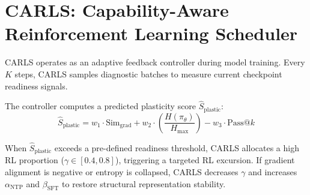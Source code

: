 \section{CARLS: Capability-Aware Reinforcement Learning Scheduler}
\label{sec:carls}

CARLS operates as an adaptive feedback controller during model training. Every $K$ steps, CARLS samples diagnostic batches to measure current checkpoint readiness signals.

The controller computes a predicted plasticity score $\hat{S}_{\text{plastic}}$:
\begin{equation}
    \hat{S}_{\text{plastic}} = w_1 \cdot \text{Sim}_{\text{grad}} + w_2 \cdot \left(\frac{H(\pi_\theta)}{H_{\text{max}}}\right) - w_3 \cdot \text{Pass}@k
\end{equation}

When $\hat{S}_{\text{plastic}}$ exceeds a pre-defined readiness threshold, CARLS allocates a high RL proportion ($\gamma \in [0.4, 0.8]$), triggering a targeted RL excursion. If gradient alignment is negative or entropy is collapsed, CARLS decreases $\gamma$ and increases $\alpha_{\text{NTP}}$ and $\beta_{\text{SFT}}$ to restore structural representation stability.

